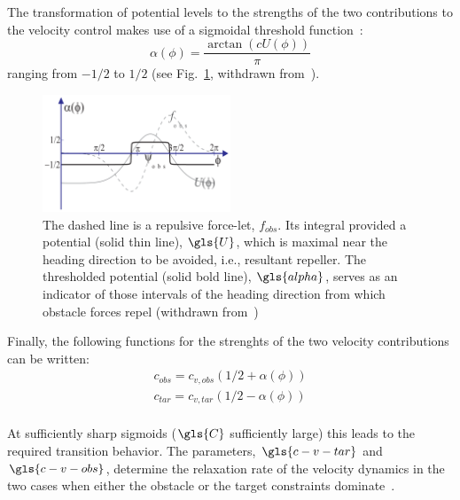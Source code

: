 The transformation of potential levels to the strengths of the two contributions
to the velocity control makes use of a sigmoidal threshold
function~\cite{bicho2000dynamic}:
\begin{equation}
  \label{eq:42}
  \alpha(\phi) = \frac{\arctan(c U(\phi))}{\pi}
\end{equation}
ranging from $-1/2$ to $1/2$ (see Fig.~\ref{fig:lyapunov}, withdrawn from~\cite{bicho2000dynamic}). 
%
\begin{figure}[!hbt]
\centering
    \includegraphics[width=0.5\textwidth]{./img/lyapunov.png}
  \caption[Control of driving speed: threshold potential, potential and
  repulsive force-let (withdrawn from~\cite{bicho2000dynamic})]{The dashed line
    is a repulsive force-let, $f_{obs}$. Its integral provided a potential
    (solid thin line), $\gls{U}$, which is maximal near the heading direction to be
    avoided, i.e., resultant repeller. The thresholded potential (solid bold
    line), $\gls{alpha}$, serves as an indicator of those intervals of the heading
    direction from which obstacle forces repel (withdrawn from~\cite{bicho2000dynamic})}%
\label{fig:lyapunov}
\end{figure}

Finally, the following functions for
the strenghts of the two velocity contributions can be written:
\begin{equation}
  \label{eq:41}
\begin{array}{ll}
      c_{obs} = c_{v,obs} (1/2 + \alpha(\phi) ) \\
      c_{tar} = c_{v,tar} (1/2 - \alpha(\phi) ) \\
\end{array} 
\end{equation}

At sufficiently sharp sigmoids ($\gls{C}$ sufficiently large) this leads to the
required transition behavior. The parameters, $\gls{c-v-tar}$ and $\gls{c-v-obs}$,
determine the relaxation rate of the velocity dynamics in the two cases when
either the obstacle or the target constraints dominate~\cite{bicho2000dynamic}. 

